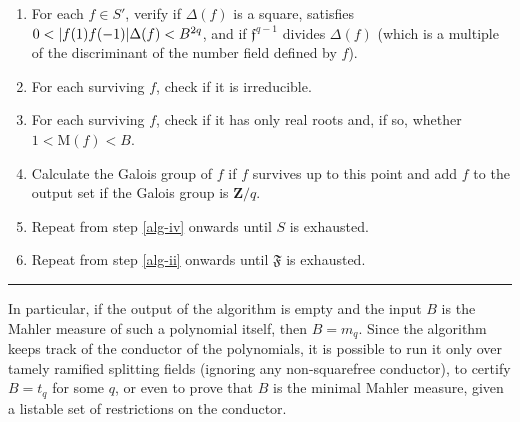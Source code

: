 \documentclass[12pt,reqno]{amsart}
\theoremstyle{definition}
\theoremstyle{plain}
\theoremstyle{definition}
\newcommand{\mf}{\mathfrak}
\newcommand{\Z}{\mathbf{Z}}
\newcommand{\MM}{\mathrm{M}}
\DeclarePairedDelimiter\abs{\lvert}{\rvert}
\begin{document}
\begin{enumerate}
\item \label{alg-v} For each $f \in S'$, verify if $\Delta(f)$ is a square, satisfies $0 < \abs{f(1)f(-1)}\Delta(f) < B^{2q}$, and if $\mf{f}^{q-1}$ divides $\Delta(f)$ (which is a multiple of the discriminant of the number field defined by $f$).

\item \label{alg-vi} For each surviving $f$, check if it is irreducible.

\item \label{alg-vii} For each surviving $f$, check if it has only real roots and, if so, whether $1 < \MM(f) < B$.

\item \label{alg-viii} Calculate the Galois group of $f$ if $f$ survives up to this point and add $f$ to the output set if the Galois group is $\Z/q$.

\item \label{alg-ix} Repeat from step \eqref{alg-iv} onwards until $S$ is exhausted.

\item \label{alg-x} Repeat from step \eqref{alg-ii} onwards until $\mf{F}$ is exhausted.
\end{enumerate}
\hrule 

\bigskip

In particular, if the output of the algorithm is empty and the input $B$ is the Mahler measure of such a polynomial itself, then $B=m_q$. Since the algorithm keeps track of the conductor of the polynomials, it is possible to run it only over tamely ramified splitting fields (ignoring any non-squarefree conductor), to certify $B=t_q$ for some $q$, or even to prove that $B$ is the minimal Mahler measure, given a listable set of restrictions on the conductor. 
\end{document}
